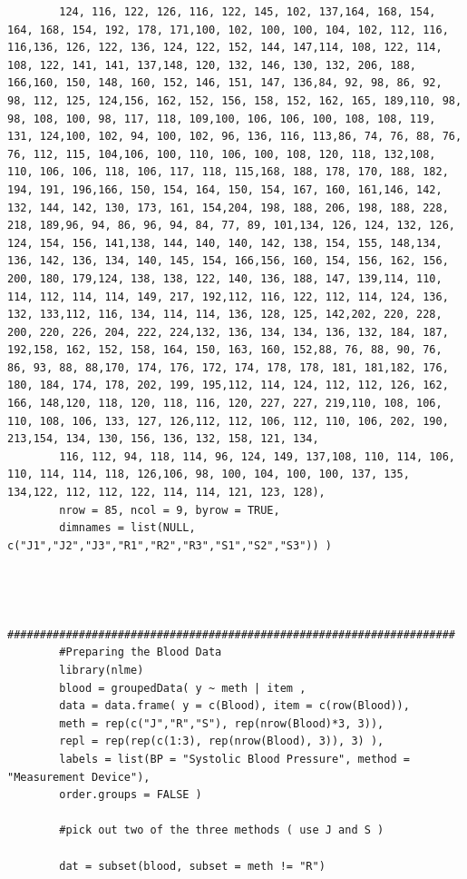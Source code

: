 \documentclass[12pt, a4paper]{report}
\theoremstyle{plain}
\theoremstyle{definition}
\theoremstyle{remark}
\begin{document}
\begin{framed}
\begin{verbatim}
		124, 116, 122, 126, 116, 122, 145, 102, 137,164, 168, 154, 164, 168, 154, 192, 178, 171,100, 102, 100, 100, 104, 102, 112, 116, 116,136, 126, 122, 136, 124, 122, 152, 144, 147,114, 108, 122, 114, 108, 122, 141, 141, 137,148, 120, 132, 146, 130, 132, 206, 188, 166,160, 150, 148, 160, 152, 146, 151, 147, 136,84, 92, 98, 86, 92, 98, 112, 125, 124,156, 162, 152, 156, 158, 152, 162, 165, 189,110, 98, 98, 108, 100, 98, 117, 118, 109,100, 106, 106, 100, 108, 108, 119, 131, 124,100, 102, 94, 100, 102, 96, 136, 116, 113,86, 74, 76, 88, 76, 76, 112, 115, 104,106, 100, 110, 106, 100, 108, 120, 118, 132,108, 110, 106, 106, 118, 106, 117, 118, 115,168, 188, 178, 170, 188, 182, 194, 191, 196,166, 150, 154, 164, 150, 154, 167, 160, 161,146, 142, 132, 144, 142, 130, 173, 161, 154,204, 198, 188, 206, 198, 188, 228, 218, 189,96, 94, 86, 96, 94, 84, 77, 89, 101,134, 126, 124, 132, 126, 124, 154, 156, 141,138, 144, 140, 140, 142, 138, 154, 155, 148,134, 136, 142, 136, 134, 140, 145, 154, 166,156, 160, 154, 156, 162, 156, 200, 180, 179,124, 138, 138, 122, 140, 136, 188, 147, 139,114, 110, 114, 112, 114, 114, 149, 217, 192,112, 116, 122, 112, 114, 124, 136, 132, 133,112, 116, 134, 114, 114, 136, 128, 125, 142,202, 220, 228, 200, 220, 226, 204, 222, 224,132, 136, 134, 134, 136, 132, 184, 187, 192,158, 162, 152, 158, 164, 150, 163, 160, 152,88, 76, 88, 90, 76, 86, 93, 88, 88,170, 174, 176, 172, 174, 178, 178, 181, 181,182, 176, 180, 184, 174, 178, 202, 199, 195,112, 114, 124, 112, 112, 126, 162, 166, 148,120, 118, 120, 118, 116, 120, 227, 227, 219,110, 108, 106, 110, 108, 106, 133, 127, 126,112, 112, 106, 112, 110, 106, 202, 190, 213,154, 134, 130, 156, 136, 132, 158, 121, 134,
		116, 112, 94, 118, 114, 96, 124, 149, 137,108, 110, 114, 106, 110, 114, 114, 118, 126,106, 98, 100, 104, 100, 100, 137, 135, 134,122, 112, 112, 122, 114, 114, 121, 123, 128), 
		nrow = 85, ncol = 9, byrow = TRUE,
		dimnames = list(NULL, c("J1","J2","J3","R1","R2","R3","S1","S2","S3")) )
		
		
		
		#####################################################################
		#Preparing the Blood Data
		library(nlme)
		blood = groupedData( y ~ meth | item ,
		data = data.frame( y = c(Blood), item = c(row(Blood)),
		meth = rep(c("J","R","S"), rep(nrow(Blood)*3, 3)),
		repl = rep(rep(c(1:3), rep(nrow(Blood), 3)), 3) ),
		labels = list(BP = "Systolic Blood Pressure", method = "Measurement Device"),
		order.groups = FALSE )
		
		#pick out two of the three methods ( use J and S ) 
		
		dat = subset(blood, subset = meth != "R")
		\end{verbatim}
	\end{framed}
	\newpage
	
\end{document}
